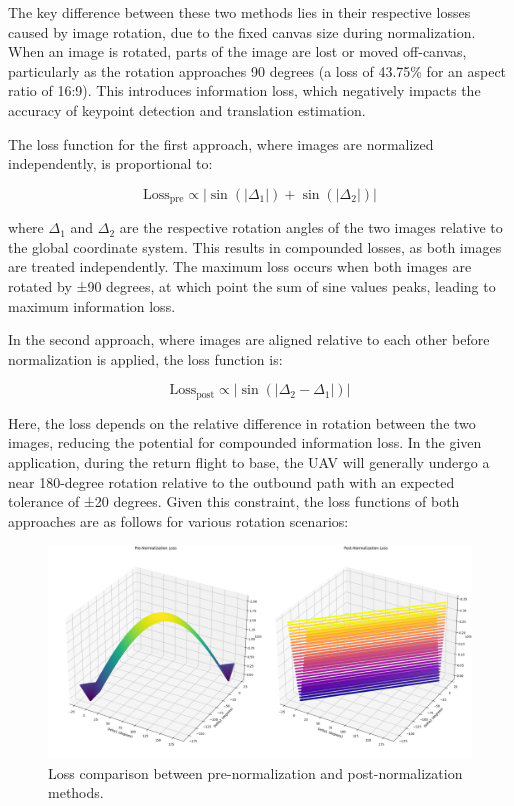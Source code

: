 The key difference between these two methods lies in their respective losses caused by image rotation, due to the fixed canvas size during normalization. When an image is rotated, parts of the image are lost or moved off-canvas, particularly as the rotation approaches 90 degrees (a loss of 43.75\% for an aspect ratio of 16:9). This introduces information loss, which negatively impacts the accuracy of keypoint detection and translation estimation.

The loss function for the first approach, where images are normalized independently, is proportional to:

\begin{equation}
\text{Loss}_{\text{pre}} \propto |\sin(|\Delta_1|) + \sin(|\Delta_2|)|
\end{equation}

where \( \Delta_1 \) and \( \Delta_2 \) are the respective rotation angles of the two images relative to the global coordinate system. This results in compounded losses, as both images are treated independently. The maximum loss occurs when both images are rotated by ±90 degrees, at which point the sum of sine values peaks, leading to maximum information loss.

In the second approach, where images are aligned relative to each other before normalization is applied, the loss function is:

\begin{equation}
\text{Loss}_{\text{post}} \propto |\sin(|\Delta_2 - \Delta_1|)|
\end{equation}


Here, the loss depends on the relative difference in rotation between the two images, reducing the potential for compounded information loss. In the given application, during the return flight to base, the UAV will generally undergo a near 180-degree rotation relative to the outbound path with an expected tolerance of ±20 degrees. Given this constraint, the loss functions of both approaches are as follows for various rotation scenarios:

\begin{figure}[H]
    \centering
    \includegraphics[width=\textwidth]{Chapter 4/Figs4/lossprevspost.png}
    \caption{Loss comparison between pre-normalization and post-normalization methods.}
    \label{fig:lossprevpost}
\end{figure}


